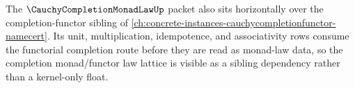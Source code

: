 The $\CauchyCompletionMonadLawUp$ packet also sits horizontally over the completion-functor sibling of \autoref{ch:concrete-instances-cauchycompletionfunctor-namecert}. Its unit, multiplication, idempotence, and associativity rows consume the functorial completion route before they are read as monad-law data, so the completion monad/functor law lattice is visible as a sibling dependency rather than a kernel-only float.
